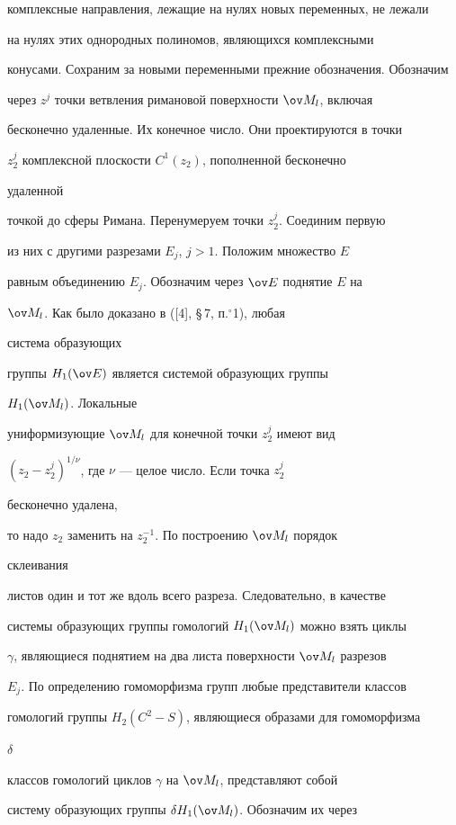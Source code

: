 комплексные направления, лежащие на нулях новых переменных, не лежали 


на нулях этих однородных полиномов, являющихся комплексными  


конусами. Сохраним за новыми переменными прежние обозначения. Обозначим 


через $z^j$ точки ветвления римановой поверхности $\ov M_l$, включая  


бесконечно удаленные. Их конечное число. Они проектируются в точки 


$z^j_2$ комплексной плоскости $C^1(z_2)$, пополненной бесконечно 


удаленной 


точкой до сферы Римана. Перенумеруем точки $z^j_2$. Соединим первую 


из них с другими разрезами $E_j$, $j>1$. Положим множество $E$


равным объединению $E_j$. Обозначим через $\ov E$ поднятие $E$ на 


$\ov M_l$. Как было доказано в ([4], \S\,7, п.${}^\circ$1), любая 


система образующих  


группы $H_1(\ov E)$ является системой образующих группы 


$H_1(\ov M_l)$. Локальные 


униформизующие $\ov M_l$ для конечной точки $z^j_2$ имеют вид 


$(z_2-z^j_2)^{1/\nu}$, где $\nu$ --- целое число. Если точка $z^j_2$ 


бесконечно удалена, 


то надо $z_2$ заменить на $z^{-1}_2$. По построению $\ov M_l$ порядок 


склеивания 


листов один и тот же вдоль всего разреза. Следовательно, в качестве 


системы образующих группы гомологий $H_1(\ov M_l)$ можно взять циклы  


$\gamma$, являющиеся поднятием на два листа поверхности $\ov M_l$ разрезов  


$E_j$. По определению гомоморфизма групп любые представители классов 


гомологий группы $H_2(C^2-S)$, являющиеся образами для гомоморфизма 


$\delta$ 


классов гомологий циклов $\gamma$ на $\ov M_l$, представляют собой 


систему образующих группы $\delta H_1(\ov M_l)$. Обозначим их через 


